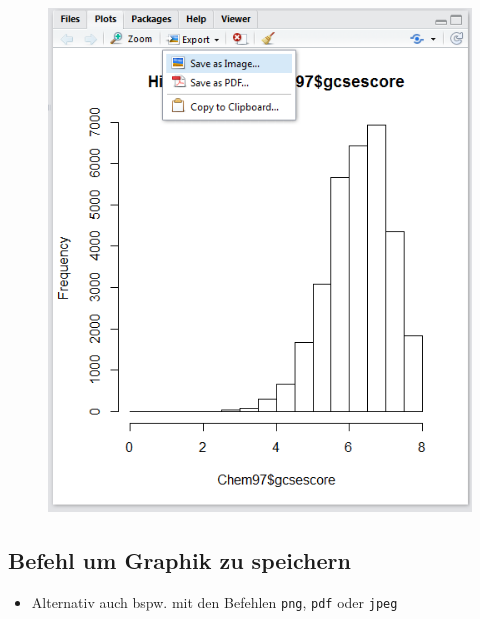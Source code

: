 \documentclass[]{article}
\newenvironment{Shaded}{\begin{snugshade}}{\end{snugshade}}
\newcommand{\KeywordTok}[1]{\textcolor[rgb]{0.13,0.29,0.53}{\textbf{{#1}}}}
\newcommand{\StringTok}[1]{\textcolor[rgb]{0.31,0.60,0.02}{{#1}}}
\newcommand{\NormalTok}[1]{{#1}}
\providecommand{\tightlist}{%
  \setlength{\itemsep}{0pt}\setlength{\parskip}{0pt}}
\begin{document}
\begin{figure}[htbp]
\centering
\includegraphics{figure/GraphikSpeichern.PNG}
\caption{}
\end{figure}

\subsection{Befehl um Graphik zu
speichern}\label{befehl-um-graphik-zu-speichern}

\begin{itemize}
\tightlist
\item
  Alternativ auch bspw. mit den Befehlen \texttt{png}, \texttt{pdf} oder
  \texttt{jpeg}
\end{itemize}

\begin{Shaded}
\end{Shaded}
\end{document}
